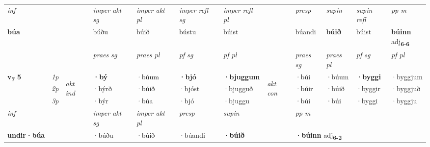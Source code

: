 \begin{longtable}[l]{X>{\footnotesize\itshape}llXXXXlXXXX}
   {\textit{inf}} & &  & \textit{imper akt sg} & \textit{imper akt pl} & \textit{imper refl sg} & \textit{imper refl pl} && \textit{presp} & \textit{supin} & \textit{supin refl} & \textit{pp m} \\*
  {\textbf{búa}} & && búðu  & búið & bústu & búist && búandi &  \textbf{búið} & búist & \specialcell{\textbf{búinn} \\ adj\textbf{\textsubscript{6-6}}} \\*

\midrule

 & &   & \textit{praes sg}  & \textit{praes pl}    & \textit{ pf sg} & \textit{pf pl} & & \textit{praes sg}  & \textit{praes pl}    & \textit{pf sg} & \textit{pf pl }  \\ \cmidrule{4-7} \cmidrule{9-12}
 \multirow{2}{*}{{{\textbf{v{\textsubscript{7}}} \Large{\textbf{5}}}}}  & 1p & \multirow{3}{*}{\begin{turn}{90}\textit{akt ind}\end{turn}} & \textbf{·bý} & ·búum & \textbf{·bjó} & \textbf{·bjuggum} & \multirow{3}{*}{\begin{turn}{90}\textit{akt con}\end{turn}} &·búi & ·búum & \textbf{·byggi} & ·byggjum\\*
 & 2p &  &  ·býrð  & ·búið & ·bjóst & ·bjugguð & & ·búir & ·búið & ·byggir & ·byggjuð \\*
 & 3p &  & ·býr & ·búa & ·bjó & ·bjuggu & & ·búi & ·búi& ·byggi & ·byggju \\*
\cmidrule{4-7} \cmidrule{9-12}

   {\textit{inf}} & &  & \textit{imper akt sg} & \textit{imper akt pl}   & \textit{presp} & \textit{supin}  && \textit{pp m} \\*
  {\textbf{undir\allowbreak ·búa}} & && ·búðu  & ·búið   & ·búandi &  \textbf{·búið}  && \multicolumn{2}{l}{\textbf{·búinn} adj\textbf{\textsubscript{6-2}}} \\*

\midrule


\end{longtable}
